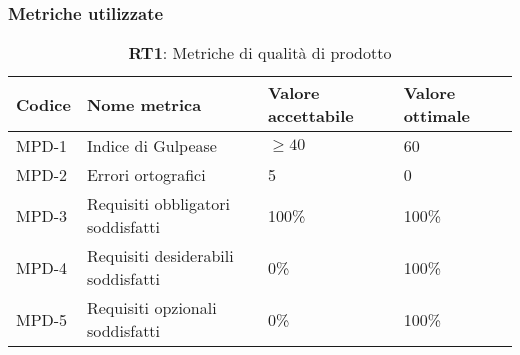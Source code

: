 \subsubsection{Metriche utilizzate}
\begin{table}[h!]
    \centering
    \renewcommand{\arraystretch}{1.5} %
    \begin{tabularx}{\textwidth}{|X|X|X|X|}\hline
    \rowcolor[HTML]{FFD700}
    \textbf{Codice} & \textbf{Nome metrica} & \textbf{Valore accettabile} & \textbf{Valore ottimale} \\ \hline
    MPD-1 & Indice di Gulpease & \( \geq 40 \) & 60 \\ \hline
    MPD-2 & Errori ortografici & 5 & 0 \\ \hline
    MPD-3 & Requisiti obbligatori soddisfatti & 100\%  & 100\%\\ \hline
    MPD-4 & Requisiti desiderabili soddisfatti & 0\% & 100\%\\ \hline
    MPD-5 & Requisiti opzionali soddisfatti & 0\% & 100\% \\ \hline

    \end{tabularx}
    \caption{\textbf{RT1}: Metriche di qualità di prodotto}
\end{table}
